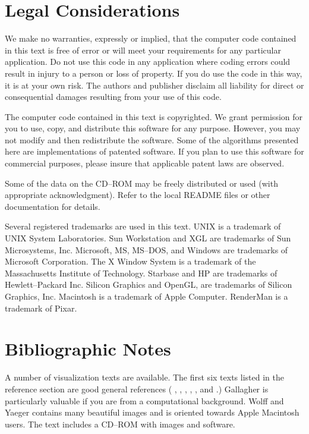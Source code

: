 \section{Legal Considerations}

We make no warranties, expressly or implied, that the computer code contained in this text is free of error or will meet your requirements for any particular application. Do not use this code in any application where coding errors could result in injury to a person or loss of property. If you do use the code in this way, it is at your own risk. The authors and publisher disclaim all liability for direct or consequential damages resulting from your use of this code.

The computer code contained in this text is copyrighted. We grant permission for you to use, copy, and distribute this software for any purpose. However, you may not modify and then redistribute the software. Some of the algorithms presented here are implementations of patented software. If you plan to use this software for commercial purposes, please insure that applicable patent laws are observed.

Some of the data on the CD--ROM may be freely distributed or used (with appropriate acknowledgment). Refer to the local README files or other documentation for details.

Several registered trademarks are used in this text. UNIX is a trademark of UNIX System Laboratories. Sun Workstation and XGL are trademarks of Sun Microsystems, Inc. Microsoft, MS, MS--DOS, and Windows are trademarks of Microsoft Corporation. The X Window System is a trademark of the Massachusetts Institute of Technology. Starbase and HP are trademarks of Hewlett--Packard Inc. Silicon Graphics and OpenGL, are trademarks of Silicon Graphics, Inc. Macintosh is a trademark of Apple Computer. RenderMan is a trademark of Pixar.

\section{Bibliographic Notes}

A number of visualization texts are available. The first six texts listed in the reference section are good general references ( \cite{Nielson90}, \cite{Patrikalakis91}, \cite{Brodlie92}, \cite{Wolff93}, \cite{Rosenblum94}, and\cite{Gallagher95} .) Gallagher \cite{Gallagher95} is particularly valuable if you are from a computational background. Wolff and Yaeger \cite{Wolff93} contains many beautiful images and is oriented towards Apple Macintosh users. The text includes a CD--ROM with images and software.

